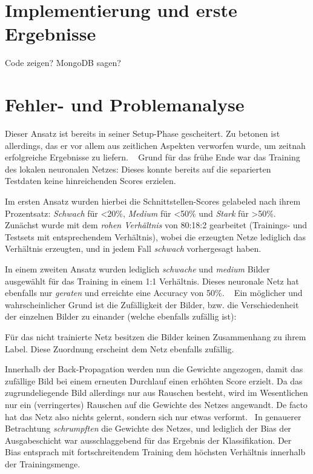 \section{Implementierung und erste Ergebnisse}
Code zeigen? MongoDB sagen? 
\newpage
\section{Fehler- und Problemanalyse}
Dieser Ansatz ist bereits in seiner Setup-Phase gescheitert. Zu betonen ist allerdings, das er vor allem aus zeitlichen Aspekten verworfen wurde, um zeitnah erfolgreiche Ergebnisse zu liefern.
~\newline
Grund für das frühe Ende war das Training des lokalen neuronalen Netzes: Dieses konnte bereits auf die separierten Testdaten keine hinreichenden Scores erzielen. 

Im ersten Ansatz wurden hierbei die Schnittstellen-Scores gelabeled nach ihrem Prozentsatz: \textit{Schwach} für <20\%, \textit{Medium} für <50\% und \textit{Stark} für >50\%. Zunächst wurde mit dem \textit{rohen Verhältnis} von 80:18:2 gearbeitet (Trainings- und Testsets mit entsprechendem Verhältnis), wobei die erzeugten Netze lediglich das Verhältnis erzeugten, und in jedem Fall \textit{schwach} vorhergesagt haben. 

In einem zweiten Ansatz wurden lediglich \textit{schwache} und \textit{medium} Bilder ausgewählt für das Training in einem 1:1 Verhältnis. Dieses neuronale Netz hat ebenfalls nur \textit{geraten} und erreichte eine Accuracy von 50\%.    
~\newline
Ein möglicher und wahrscheinlicher Grund ist die Zufälligkeit der Bilder, bzw. die Verschiedenheit der einzelnen Bilder zu einander (welche ebenfalls zufällig ist):

Für das nicht trainierte Netz besitzen die Bilder keinen Zusammenhang zu ihrem Label. Diese Zuordnung erscheint dem Netz ebenfalls zufällig. 

Innerhalb der Back-Propagation werden nun die Gewichte angezogen, damit das zufällige Bild bei einem erneuten Durchlauf einen erhöhten Score erzielt. Da das zugrundeliegende Bild allerdings nur aus Rauschen besteht, wird im Wesentlichen nur ein (verringertes) Rauschen auf die Gewichte des Netzes angewandt. De facto hat das Netz also nichts gelernt, sondern sich nur etwas verformt. 
~\newline In genauerer Betrachtung \textit{schrumpften} die Gewichte des Netzes, und lediglich der Bias der Ausgabeschicht war ausschlaggebend für das Ergebnis der Klassifikation. Der Bias entsprach mit fortschreitendem Training dem höchsten Verhältnis innerhalb der Trainingsmenge.


